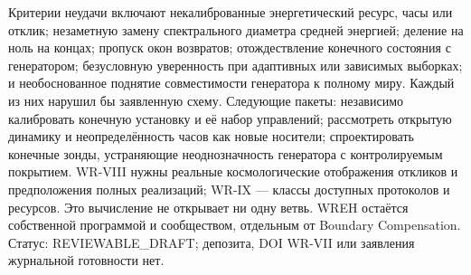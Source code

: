 {Критерии неудачи включают некалиброванные энергетический ресурс, часы или отклик; незаметную замену спектрального диаметра средней энергией; деление на ноль на концах; пропуск окон возвратов; отождествление конечного состояния с генератором; безусловную уверенность при адаптивных или зависимых выборках; и необоснованное поднятие совместимости генератора к полному миру. Каждый из них нарушил бы заявленную схему.}
{Следующие пакеты: независимо калибровать конечную установку и её набор управлений; рассмотреть открытую динамику и неопределённость часов как новые носители; спроектировать конечные зонды, устраняющие неоднозначность генератора с контролируемым покрытием. WR-VIII нужны реальные космологические отображения откликов и предположения полных реализаций; WR-IX --- классы доступных протоколов и ресурсов. Это вычисление не открывает ни одну ветвь. WREH остаётся собственной программой и сообществом, отдельным от Boundary Compensation. Статус: REVIEWABLE\_DRAFT; депозита, DOI WR-VII или заявления журнальной готовности нет.}

